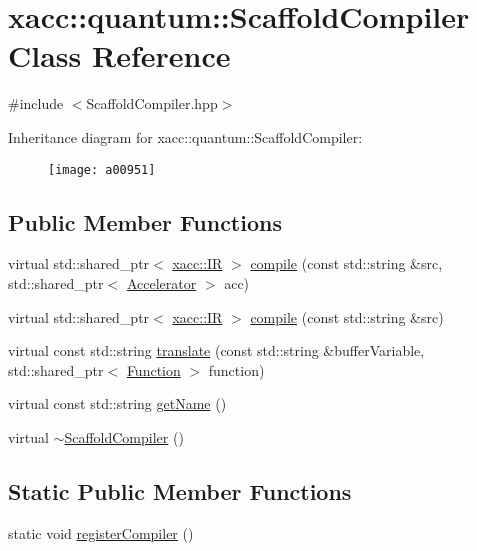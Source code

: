 \hypertarget{a00951}{}\section{xacc\+:\+:quantum\+:\+:Scaffold\+Compiler Class Reference}
\label{a00951}


{\ttfamily \#include $<$Scaffold\+Compiler.\+hpp$>$}

Inheritance diagram for xacc\+:\+:quantum\+:\+:Scaffold\+Compiler\+:\begin{figure}[H]
\begin{center}
\leavevmode
\texttt{[image: a00951]}
\end{center}
\end{figure}
\subsection*{Public Member Functions}
\begin{DoxyCompactItemize}
\item 
virtual std\+::shared\+\_\+ptr$<$ \hyperlink{a01175}{xacc\+::\+IR} $>$ \hyperlink{a00951_a7caede75bb2304ba405966651b115543}{compile} (const std\+::string \&src, std\+::shared\+\_\+ptr$<$ \hyperlink{a01111}{Accelerator} $>$ acc)
\item 
virtual std\+::shared\+\_\+ptr$<$ \hyperlink{a01175}{xacc\+::\+IR} $>$ \hyperlink{a00951_a3736ecc229fe6acdd4c991e85d7a1f08}{compile} (const std\+::string \&src)
\item 
virtual const std\+::string \hyperlink{a00951_ac7ca2941e987ba579c6f50cfbd7fb0dc}{translate} (const std\+::string \&buffer\+Variable, std\+::shared\+\_\+ptr$<$ \hyperlink{a01151}{Function} $>$ function)
\item 
virtual const std\+::string \hyperlink{a00951_a3f537054a3924a1d14f4ceb0f0181161}{get\+Name} ()
\item 
virtual \hyperlink{a00951_afb26398b07377ab9ddebc43a9376a6dd}{$\sim$\+Scaffold\+Compiler} ()
\end{DoxyCompactItemize}
\subsection*{Static Public Member Functions}
\begin{DoxyCompactItemize}
\item 
static void \hyperlink{a00951_aed16dda1e919e5af6de9953a656f62ce}{register\+Compiler} ()
\end{DoxyCompactItemize}
